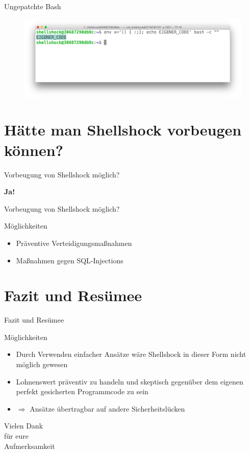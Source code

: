\documentclass[handout]{beamer}
\begin{document}
\begin{frame}{Ungepatchte Bash}
\begin{figure}
  \centering
    \includegraphics[width=1\textwidth]{assets/example2}
\end{figure}
\end{frame}

\section[Vorbeugung Shellshock?]{Hätte man Shellshock vorbeugen können?}
\begin{frame}{Vorbeugung von Shellshock möglich?}
\begin{center}
\begin{Huge}
\textbf{Ja!}
\end{Huge}
\end{center}
\end{frame}

\begin{frame}{Vorbeugung von Shellshock möglich?}
\begin{block}{Möglichkeiten}
\begin{itemize}[<+->]
\item Präventive Verteidigungsmaßnahmen
\item Maßnahmen gegen SQL-Injections
\end{itemize}
\end{block}
\end{frame}





\section[Fazit]{Fazit und Resümee}
\begin{frame}{Fazit und Resümee}
\begin{block}{Möglichkeiten}
\begin{itemize}[<+->]
\item Durch Verwenden einfacher Ansätze wäre Shellshock in dieser Form nicht möglich gewesen
\item Lohnenswert präventiv zu handeln und skeptisch gegenüber dem eigenen perfekt gesicherten Programmcode zu sein
\item $\Rightarrow$ Ansätze übertragbar auf andere Sicherheitslücken
\end{itemize}
\end{block}
\end{frame}

\begin{frame}{}
\center
\begin{Huge}
Vielen Dank \\
für eure \\
Aufmerksamkeit \\
\end{Huge}
\end{frame}
\end{document}
